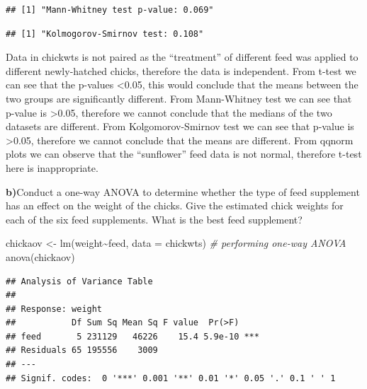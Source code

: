 \documentclass[
]{article}
\newenvironment{Shaded}{\begin{snugshade}}{\end{snugshade}}
\newcommand{\AttributeTok}[1]{\textcolor[rgb]{0.77,0.63,0.00}{#1}}
\newcommand{\CommentTok}[1]{\textcolor[rgb]{0.56,0.35,0.01}{\textit{#1}}}
\newcommand{\DecValTok}[1]{\textcolor[rgb]{0.00,0.00,0.81}{#1}}
\newcommand{\FunctionTok}[1]{\textcolor[rgb]{0.00,0.00,0.00}{#1}}
\newcommand{\NormalTok}[1]{#1}
\newcommand{\OtherTok}[1]{\textcolor[rgb]{0.56,0.35,0.01}{#1}}
\newcommand{\SpecialCharTok}[1]{\textcolor[rgb]{0.00,0.00,0.00}{#1}}
\newcommand{\StringTok}[1]{\textcolor[rgb]{0.31,0.60,0.02}{#1}}
\begin{document}
\begin{verbatim}
## [1] "Mann-Whitney test p-value: 0.069"
\end{verbatim}

\begin{Shaded}
\end{Shaded}

\begin{verbatim}
## [1] "Kolmogorov-Smirnov test: 0.108"
\end{verbatim}

Data in chickwts is not paired as the ``treatment'' of different feed
was applied to different newly-hatched chicks, therefore the data is
independent. From t-test we can see that the p-values \textless0.05,
this would conclude that the means between the two groups are
significantly different. From Mann-Whitney test we can see that p-value
is \textgreater0.05, therefore we cannot conclude that the medians of
the two datasets are different. From Kolgomorov-Smirnov test we can see
that p-value is \textgreater0.05, therefore we cannot conclude that the
means are different. From qqnorm plots we can observe that the
``sunflower'' feed data is not normal, therefore t-test here is
inappropriate.

\textbf{b)}Conduct a one-way ANOVA to determine whether the type of feed
supplement has an effect on the weight of the chicks. Give the estimated
chick weights for each of the six feed supplements. What is the best
feed supplement?

\begin{Shaded}
\begin{Highlighting}[]
\NormalTok{chickaov }\OtherTok{\textless{}{-}} \FunctionTok{lm}\NormalTok{(weight}\SpecialCharTok{\textasciitilde{}}\NormalTok{feed, }\AttributeTok{data =}\NormalTok{ chickwts)}
\CommentTok{\# performing one{-}way ANOVA}
\FunctionTok{anova}\NormalTok{(chickaov)}
\end{Highlighting}
\end{Shaded}

\begin{verbatim}
## Analysis of Variance Table
## 
## Response: weight
##           Df Sum Sq Mean Sq F value  Pr(>F)    
## feed       5 231129   46226    15.4 5.9e-10 ***
## Residuals 65 195556    3009                    
## ---
## Signif. codes:  0 '***' 0.001 '**' 0.01 '*' 0.05 '.' 0.1 ' ' 1
\end{verbatim}
\end{document}
